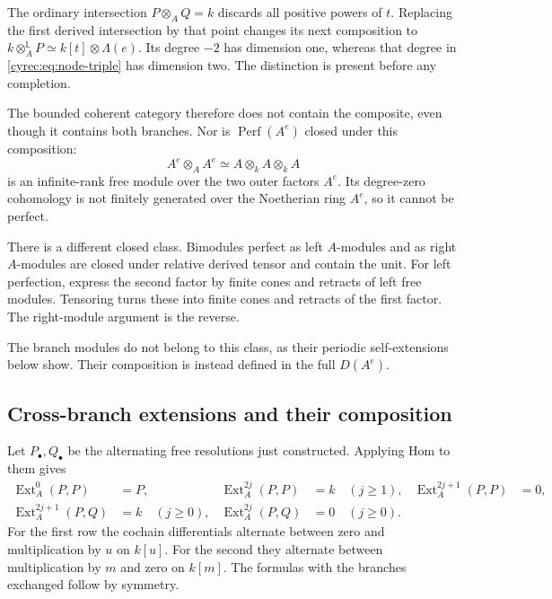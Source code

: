 The ordinary intersection $P\otimes_AQ=k$ discards all positive
powers of $t$. Replacing the first derived intersection by that
point changes its next composition to
$k\otimes_A^{\mathbb L}P\simeq k[t]\otimes\Lambda(e)$.
Its degree $-2$ has dimension one, whereas that degree in
\eqref{cyrec:eq:node-triple} has dimension two.
The distinction is present before any completion.

The bounded coherent category therefore does not contain the
composite, even though it contains both branches.
Nor is $\operatorname{Perf}(A^e)$ closed under this composition:
\[
 A^e\otimes_A A^e\simeq A\otimes_kA\otimes_kA
\]
is an infinite-rank free module over the two outer factors $A^e$.
Its degree-zero cohomology is not finitely generated over the
Noetherian ring $A^e$, so it cannot be perfect.

There is a different closed class. Bimodules perfect as left
$A$-modules and as right $A$-modules are closed under relative
derived tensor and contain the unit. For left perfection, express
the second factor by finite cones and retracts of left free
modules. Tensoring turns these into finite cones and retracts of
the first factor. The right-module argument is the reverse.

The branch modules do not belong to this class, as their periodic
self-extensions below show. Their composition is instead defined
in the full $D(A^e)$.

\subsection{Cross-branch extensions and their composition}

Let $P_\bullet,Q_\bullet$ be the alternating free resolutions
just constructed. Applying Hom to them gives
\begin{equation}\label{cyrec:eq:branch-ext}
\begin{aligned}
 \operatorname{Ext}^0_A(P,P)&=P,&
 \operatorname{Ext}^{2j}_A(P,P)&=k\quad(j\geq1),&
 \operatorname{Ext}^{2j+1}_A(P,P)&=0,\\
 \operatorname{Ext}^{2j+1}_A(P,Q)&=k\quad(j\geq0),&
 \operatorname{Ext}^{2j}_A(P,Q)&=0\quad(j\geq0).
\end{aligned}
\end{equation}
For the first row the cochain differentials alternate between
zero and multiplication by $u$ on $k[u]$.
For the second they alternate between multiplication by $m$
and zero on $k[m]$. The formulas with the branches exchanged
follow by symmetry.

